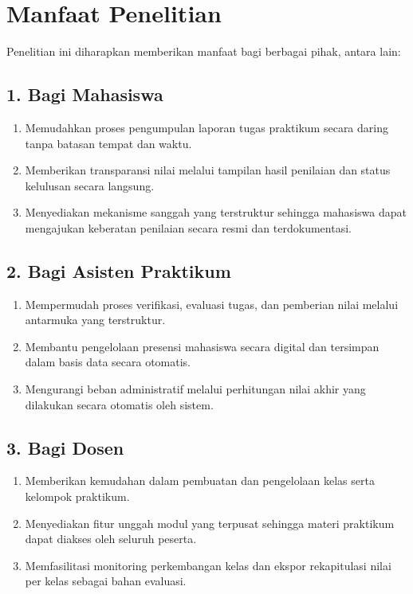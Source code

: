 \documentclass[12pt,a4paper,twoside]{report}
\begin{document}
\section{Manfaat Penelitian}

Penelitian ini diharapkan memberikan manfaat bagi berbagai pihak, antara lain:

\subsection*{1. Bagi Mahasiswa}
\begin{enumerate}[label=\alph*.]
    \item Memudahkan proses pengumpulan laporan tugas praktikum secara daring tanpa batasan tempat dan waktu.
    \item Memberikan transparansi nilai melalui tampilan hasil penilaian dan status kelulusan secara langsung.
    \item Menyediakan mekanisme sanggah yang terstruktur sehingga mahasiswa dapat mengajukan keberatan penilaian secara resmi dan terdokumentasi.
\end{enumerate}

\subsection*{2. Bagi Asisten Praktikum}
\begin{enumerate}[label=\alph*.]
    \item Mempermudah proses verifikasi, evaluasi tugas, dan pemberian nilai melalui antarmuka yang terstruktur.
    \item Membantu pengelolaan presensi mahasiswa secara digital dan tersimpan dalam basis data secara otomatis.
    \item Mengurangi beban administratif melalui perhitungan nilai akhir yang dilakukan secara otomatis oleh sistem.
\end{enumerate}

\subsection*{3. Bagi Dosen}
\begin{enumerate}[label=\alph*.]
    \item Memberikan kemudahan dalam pembuatan dan pengelolaan kelas serta kelompok praktikum.
    \item Menyediakan fitur unggah modul yang terpusat sehingga materi praktikum dapat diakses oleh seluruh peserta.
    \item Memfasilitasi monitoring perkembangan kelas dan ekspor rekapitulasi nilai per kelas sebagai bahan evaluasi.
\end{enumerate}
\end{document}
